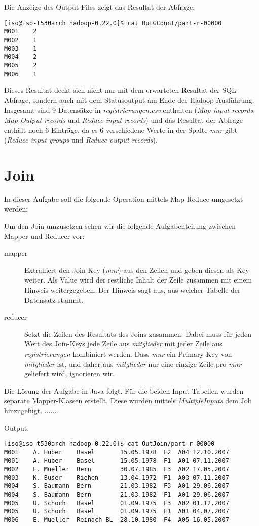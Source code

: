 \documentclass[11pt,a4paper,parskip=half]{scrartcl}
\begin{document}
Die Anzeige des Output-Files zeigt das Resultat der Abfrage:
\begin{lstlisting}
[iso@iso-t530arch hadoop-0.22.0]$ cat OutGCount/part-r-00000 
M001	2
M002	1
M003	1
M004	2
M005	2
M006	1
\end{lstlisting}

Dieses Resultat deckt sich nicht nur mit dem erwarteten Resultat der SQL-Abfrage, sondern auch mit dem Statusoutput am Ende der Hadoop-Ausführung. Insgesamt sind 9 Datensätze in \emph{registrierungen.csv} enthalten (\emph{Map input records}, \emph{Map Output records} und \emph{Reduce input records}) und das Resultat der Abfrage enthält noch 6 Einträge, da es 6 verschiedene Werte in der Spalte \emph{mnr} gibt (\emph{Reduce input groups} und \emph{Reduce output records}).


\section{Join}
In dieser Aufgabe soll die folgende Operation mittels Map Reduce umgesetzt werden:


Um den Join umzusetzen sehen wir die folgende Aufgabenteilung zwischen Mapper und Reducer vor:
\begin{description}
	\item[mapper]	Extrahiert den Join-Key (\emph{mnr}) aus den Zeilen und geben diesen als Key weiter. Als Value wird der restliche Inhalt der Zeile zusammen mit einem Hinweis weitergegeben. Der Hinweis sagt aus, aus welcher Tabelle der Datensatz stammt.
	\item[reducer]	Setzt die Zeilen des Resultats des Joins zusammen. Dabei muss für jeden Wert des Join-Keys jede Zeile aus \emph{mitglieder} mit jeder Zeile aus \emph{registrierungen} kombiniert werden. Dass \emph{mnr} ein Primary-Key von \emph{mitglieder} ist, und daher aus \emph{mitglieder} nur eine einzige Zeile pro \emph{mnr} geliefert wird, ignorieren wir.
\end{description}

Die Lösung der Aufgabe in Java folgt. Für die beiden Input-Tabellen wurden separate Mapper-Klassen erstellt. Diese wurden mittels \emph{MultipleInputs} dem Job hinzugefügt. .......



Output:
\begin{lstlisting}
[iso@iso-t530arch hadoop-0.22.0]$ cat OutJoin/part-r-00000 
M001	A. Huber	Basel		15.05.1978	F2	A04	12.10.2007
M001	A. Huber	Basel		15.05.1978	F1	A01	07.11.2007
M002	E. Mueller	Bern		30.07.1985	F3	A02	17.05.2007
M003	K. Buser	Riehen		13.04.1972	F1	A03	07.11.2007
M004	S. Baumann	Bern		21.03.1982	F3	A01	29.06.2007
M004	S. Baumann	Bern		21.03.1982	F1	A01	29.06.2007
M005	U. Schoch	Basel		01.09.1975	F3	A02	01.12.2007
M005	U. Schoch	Basel		01.09.1975	F1	A01	04.07.2007
M006	E. Mueller	Reinach BL	28.10.1980	F4	A05	16.05.2007
\end{lstlisting}
\end{document}
